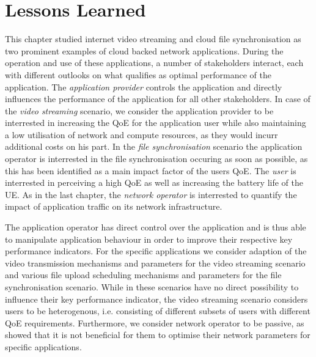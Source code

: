 \section{Lessons Learned}\label{sec:application:lessons_learned}
This chapter studied internet video streaming and cloud file synchronisation as two prominent examples of cloud backed network applications.
During the operation and use of these applications, a number of stakeholders interact, each with different outlooks on what qualifies as optimal performance of the application.
The \emph{application provider} controls the application and directly influences the performance of the application for all other stakeholders.
In case of the \emph{video streaming} scenario, we consider the application provider to be interrested in increasing the \gls{QoE} for the application user while also maintaining a low utilisation of network and compute resources, as they would incurr additional costs on his part.
In the \emph{file synchronisation} scenario the application operator is interrested in the file synchronisation occuring as soon as possible, as this has been identified as a main impact factor of the users \gls{QoE}.
The \emph{user} is interrested in perceiving a high \gls{QoE} as well as increasing the battery life of the \gls{UE}.
As in the last chapter, the \emph{network operator} is interrested to quantify the impact of application traffic on its network infrastructure.

The application operator has direct control over the application and is thus able to manipulate application behaviour in order to improve their respective key performance indicators.
For the specific applications we consider adaption of the video transmission mechanisms and parameters for the video streaming scenario and various file upload scheduling mechanisms and parameters for the file synchronisation scenario.
While in these scenarios have no direct possibility to influence their key performance indicator, the video streaming scenario considers users to be heterogenous, i.e. consisting of different subsets of users with different \gls{QoE} requirements.
Furthermore, we consider network operator to be passive, as  showed that it is not beneficial for them to optimise their network parameters for specific applications.


